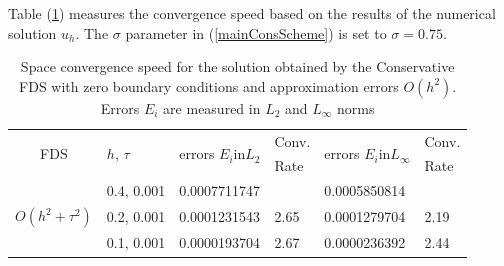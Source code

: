 \documentclass[%
 aip,
cp,  
 amsmath,amssymb,
 reprint,
]{iopconfser}
\newcommand{\rf}[1]{(\ref{#1})}
\begin{document}
Table \rf{tableC} measures the convergence speed based on the results of the numerical solution $u_h$. The $\sigma$ parameter in \rf{mainConsScheme} is set to $\sigma = 0.75$. 
\begin{table}[ht]
\centering
\small
		\begin{tabular}{||c|l|ll|ll||}
			\hline
			\hline
      \multirow{2  }{*}{FDS}        & \multirow{2  }{*}{$h$, $\tau$}  & \multirow{2  }{*}{errors $E_i$in$L_2$}  &Conv.& \multirow{2  }{*}{errors $E_i$in$L_\infty$}  &Conv.  \\
	                                        &                                                     &                                                                 &  Rate &                                                                       & Rate \\
   			\hline 
					\hline 
                                   &0.4, 0.001         & 0.0007711747   &                & 0.0005850814  &           \\
   $O(h^2 + \tau^ 2)$  &0.2, 0.001         & 0.0001231543   & 2.65       & 0.0001279704   &    2.19   \\
                                   &0.1, 0.001        & 0.0000193704    & 2.67     & 0.0000236392   &   2.44   \\
	   \hline
			\hline 
		\end{tabular}
		\caption{Space convergence speed for the solution obtained by the Conservative FDS with zero boundary conditions and approximation errors $O(h^{2})$. Errors $E_i$ are measured in $L_2$ and $L_\infty$ norms}
\label{tableC}
\end{table}
\end{document}
